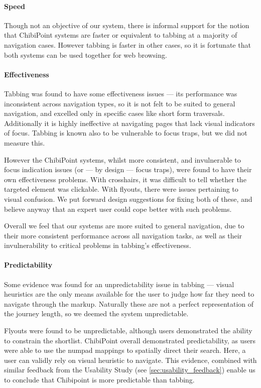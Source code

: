 \documentclass[11pt,openright,a4paper]{report}
\begin{document}
\paragraph{Speed}
Though not an objective of our system, there is informal support for the notion that ChibiPoint systems are faster or equivalent to tabbing at a majority of navigation cases. However tabbing is faster in other cases, so it is fortunate that both systems can be used together for web browsing.

\paragraph{Effectiveness}
Tabbing was found to have some effectiveness issues --- its performance was inconsistent across navigation types, so it is not felt to be suited to general navigation, and excelled only in specific cases like short form traversals. Additionally it is highly ineffective at navigating pages that lack visual indicators of focus. Tabbing is known also to be vulnerable to focus traps, but we did not measure this.

However the ChibiPoint systems, whilst more consistent, and invulnerable to focus indication issues (or --- by design --- focus traps), were found to have their own effectiveness problems. With crosshairs, it was difficult to tell whether the targeted element was clickable. With flyouts, there were issues pertaining to visual confusion. We put forward design suggestions for fixing both of these, and believe anyway that an expert user could cope better with such problems.

Overall we feel that our systems are more suited to general navigation, due to their more consistent performance across all navigation tasks, as well as their invulnerability to critical problems in tabbing's effectiveness.

\paragraph{Predictability}
Some evidence was found for an unpredictability issue in tabbing --- visual heuristics are the only means available for the user to judge how far they need to navigate through the markup. Naturally these are not a perfect representation of the journey length, so we deemed the system unpredictable.

Flyouts were found to be unpredictable, although users demonstrated the ability to constrain the shortlist. ChibiPoint overall demonstrated predictability, as users were able to use the numpad mappings to spatially direct their search. Here, a user can validly rely on visual heuristic to navigate. This evidence, combined with similar feedback from the Usability Study (see \cref{sec:usability_feedback}) enable us to conclude that Chibipoint is more predictable than tabbing.
\end{document}
